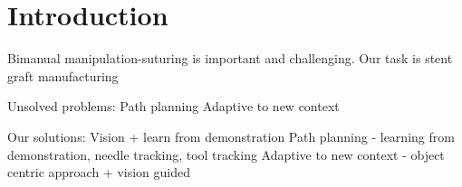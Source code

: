 \section{Introduction} 

Bimanual manipulation-suturing is important and challenging.
Our task is stent graft manufacturing

Unsolved problems:
Path planning 
Adaptive to new context 

Our solutions:
Vision + learn from demonstration
Path planning - learning from demonstration, needle tracking, tool tracking
Adaptive to new context - object centric approach + vision guided 

~\cite{bidan2013grasp}